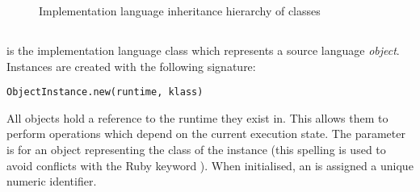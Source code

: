 \begin{figure}
\begin{center}
\caption{Implementation language inheritance hierarchy of  classes}
\label{fig:data_object_hierarchy}
\end{center}
\end{figure}

\subsection{}

 is the implementation language class which represents a source language \textit{object}. Instances are created with the following signature:

\begin{lstlisting}
ObjectInstance.new(runtime, klass)
\end{lstlisting}

All  objects hold a reference to the runtime they exist in. This allows them to perform operations which depend on the current execution state. The  parameter is for an object representing the class of the instance (this spelling is used to avoid conflicts with the Ruby keyword ). When initialised, an  is assigned a unique numeric identifier.

